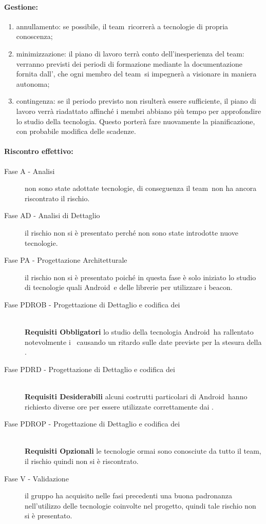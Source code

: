 \documentclass[../PianoProgetto.tex]{subfiles}
\begin{document}
	\paragraph*{Gestione:}
	\begin{enumerate}
		\item annullamento: se possibile, il team\g\ ricorrerà a tecnologie di propria conoscenza;
		\item minimizzazione: il piano di lavoro terrà conto dell'inesperienza del team\g : verranno previsti dei periodi di formazione mediante la documentazione fornita dall'\amministratore , che ogni membro del team\g\ si impegnerà a visionare in maniera autonoma;
		\item contingenza: se il periodo previsto non risulterà essere sufficiente, il piano di lavoro verrà riadattato affinché i membri abbiano più tempo per approfondire lo studio della tecnologia. Questo porterà fare nuovamente la pianificazione, con probabile modifica delle scadenze.
	\end{enumerate}
	
	
	\paragraph*{Riscontro effettivo:} 
		\begin{description}
			\item[Fase A - Analisi] non sono state adottate tecnologie, di conseguenza il team\g\ non ha ancora riscontrato il rischio.
			\item[Fase AD - Analisi di Dettaglio] il rischio non si è presentato perché non sono state introdotte nuove tecnologie.
			\item[Fase PA - Progettazione Architetturale] il rischio non si è presentato poiché in questa fase è solo iniziato lo studio di tecnologie quali Android\g\ e delle librerie per utilizzare i beacon\g.
			\item[Fase PDROB - Progettazione di Dettaglio e codifica dei]  \ \\
					 \textbf{Requisiti Obbligatori} lo studio della tecnologia Android\g\ ha rallentato notevolmente i \progettisti\, causando un ritardo sulle date previste per la stesura della .
			\item[Fase PDRD - Progettazione di Dettaglio e codifica dei] \ \\
					\textbf{Requisiti Desiderabili} alcuni costrutti particolari di Android\g\ hanno richiesto diverse ore per essere utilizzate correttamente dai \programmatori.
			\item[Fase PDROP - Progettazione di Dettaglio e codifica dei]  \ \\
					\textbf{Requisiti Opzionali} le tecnologie ormai sono conosciute da tutto il team, il rischio quindi non si è riscontrato.
			\item[Fase V - Validazione] il gruppo ha acquisito nelle fasi precedenti una buona padronanza nell'utilizzo delle tecnologie coinvolte nel progetto, quindi tale rischio non si è presentato.
		\end{description}
\end{document}
